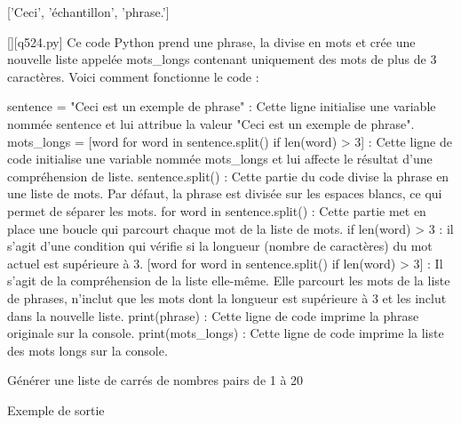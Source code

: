 ['Ceci', 'échantillon', 'phrase.']
        \par
        \begin{solution}
            \renewcommand{\nomfichier}{q524.py}
            \pythonfile{\chemincode \nomfichier}[][\nomfichier]
            Ce code Python prend une phrase, la divise en mots et crée une nouvelle liste appelée mots\_longs contenant uniquement des mots de plus de 3 caractères. Voici comment fonctionne le code :

    sentence = "Ceci est un exemple de phrase" : Cette ligne initialise une variable nommée sentence et lui attribue la valeur "Ceci est un exemple de phrase".
    mots\_longs = [word for word in sentence.split() if len(word) > 3] : Cette ligne de code initialise une variable nommée mots\_longs et lui affecte le résultat d'une compréhension de liste.
        sentence.split() : Cette partie du code divise la phrase en une liste de mots. Par défaut, la phrase est divisée sur les espaces blancs, ce qui permet de séparer les mots.
        for word in sentence.split() : Cette partie met en place une boucle qui parcourt chaque mot de la liste de mots.
        if len(word) > 3 : il s'agit d'une condition qui vérifie si la longueur (nombre de caractères) du mot actuel est supérieure à 3.
        [word for word in sentence.split() if len(word) > 3] : Il s'agit de la compréhension de la liste elle-même. Elle parcourt les mots de la liste de phrases, n'inclut que les mots dont la longueur est supérieure à 3 et les inclut dans la nouvelle liste.
    print(phrase) : Cette ligne de code imprime la phrase originale sur la console.
    print(mots\_longs) : Cette ligne de code imprime la liste des mots longs sur la console.
        \end{solution}
        

        \question
        Générer une liste de carrés de nombres pairs de 1 à 20

Exemple de sortie

